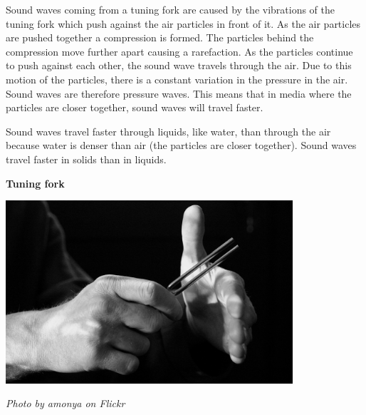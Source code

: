 \begin{minipage}{.5\textwidth}
      \label{m38783*id293458}Sound waves coming from a tuning fork are caused by the vibrations of the tuning fork which push against the air particles in front of it. As the air particles are pushed together a compression is formed. The particles behind the compression move further apart causing a rarefaction. As the particles continue to push against each other,
the sound wave travels through the air. Due to this motion of the particles, there is a constant variation in the pressure in the air. Sound waves are therefore pressure waves. This means that in media where the particles are closer together, sound waves will travel faster.\par 

      \label{m38783*id293466}Sound waves travel faster through liquids, like water, than through the air because water is denser than air (the particles are closer together). Sound waves travel faster in solids than in liquids.\par 
\end{minipage}
\begin{minipage}{.5\textwidth}\begin{center}
\textbf{Tuning fork}\par
    \includegraphics[width=0.8\textwidth]{photos/TuningFork2_Flickr_amonya.jpg}\par
\textit{Photo by amonya on Flickr}
\end{center}
\end{minipage}

